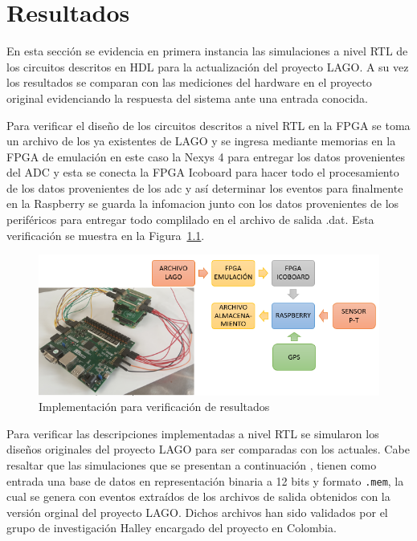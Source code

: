 
\chapter{Resultados}

En esta sección se evidencia en primera instancia las simulaciones a nivel RTL de los circuitos descritos en HDL para la actualización del proyecto LAGO. A su vez  los resultados se comparan con las mediciones del hardware en el proyecto original evidenciando la respuesta del sistema ante una entrada conocida.

Para verificar el diseño de los circuitos descritos a nivel RTL en la FPGA se toma un archivo de los ya existentes de LAGO y se ingresa mediante memorias en la FPGA de emulación en este caso la Nexys 4 para entregar los datos provenientes del ADC y esta se conecta  la FPGA Icoboard para hacer todo el procesamiento de los datos provenientes de los adc y así determinar los eventos para finalmente en la Raspberry se guarda la infomacion junto con los datos provenientes de los periféricos para entregar todo complilado en el archivo de salida .dat. Esta verificación se muestra en la Figura~\ref{verifi}.

\begin{figure}[H]
\includegraphics[width=1\textwidth]{Figs/verifica.png} 
\centering
\caption{Implementación para verificación de resultados}
\label{verifi}
\end{figure}

Para verificar las descripciones implementadas a nivel RTL se simularon los diseños originales del proyecto LAGO para ser comparadas con los actuales. Cabe resaltar que las simulaciones que se presentan a continuación , tienen como entrada una base de datos en representación binaria a 12 bits y formato \texttt{.mem}, la cual se genera con eventos extraídos de los archivos de salida obtenidos con la versión orginal del proyecto LAGO.
Dichos archivos han sido validados por el grupo de investigación Halley encargado del proyecto en Colombia.


